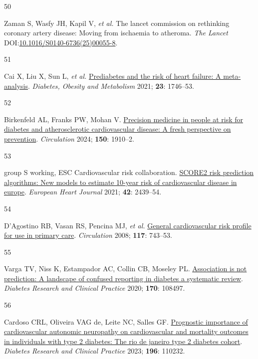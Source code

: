 \documentclass[
  a4paper,
  headsepline=true,
  open=any]{scrbook}
\newlength{\cslhangindent}
\newlength{\csllabelwidth}
\newlength{\cslentryspacingunit} %
\newenvironment{CSLReferences}[2] %
 {%
  \setlength{\parindent}{0pt}
  \ifodd #1
  \let\oldpar\par
  \def\par{\hangindent=\cslhangindent\oldpar}
  \fi
  \setlength{\parskip}{#2\cslentryspacingunit}
 }%
 {}
\newcommand{\CSLLeftMargin}[1]{\parbox[t]{\csllabelwidth}{#1}}
\newcommand{\CSLRightInline}[1]{\parbox[t]{\linewidth - \csllabelwidth}{#1}\break}
\begin{document}
\begin{CSLReferences}{0}{0}
\leavevmode{}%
\CSLLeftMargin{50 }%
\CSLRightInline{Zaman S, Wasfy JH, Kapil V, \emph{et al.} The lancet
commission on rethinking coronary artery disease: Moving from ischaemia
to atheroma. \emph{The Lancet}
DOI:\href{https://doi.org/10.1016/S0140-6736(25)00055-8}{10.1016/S0140-6736(25)00055-8}.}

\leavevmode{}%
\CSLLeftMargin{51 }%
\CSLRightInline{Cai X, Liu X, Sun L, \emph{et al.}
\href{https://doi.org/10.1111/dom.14388}{Prediabetes and the risk of
heart failure: A meta-analysis}. \emph{Diabetes, Obesity and Metabolism}
2021; \textbf{23}: 1746--53.}

\leavevmode{}%
\CSLLeftMargin{52 }%
\CSLRightInline{Birkenfeld AL, Franks PW, Mohan V.
\href{https://doi.org/10.1161/CIRCULATIONAHA.124.070463}{Precision
medicine in people at risk for diabetes and atherosclerotic
cardiovascular disease: A fresh perspective on prevention}.
\emph{Circulation} 2024; \textbf{150}: 1910--2.}

\leavevmode{}%
\CSLLeftMargin{53 }%
\CSLRightInline{group S working, ESC Cardiovascular risk collaboration.
\href{https://doi.org/10.1093/eurheartj/ehab309}{SCORE2 risk prediction
algorithms: New models to estimate 10-year risk of cardiovascular
disease in europe}. \emph{European Heart Journal} 2021; \textbf{42}:
2439--54.}

\leavevmode{}%
\CSLLeftMargin{54 }%
\CSLRightInline{D'Agostino RB, Vasan RS, Pencina MJ, \emph{et al.}
\href{https://doi.org/10.1161/CIRCULATIONAHA.107.699579}{General
cardiovascular risk profile for use in primary care}. \emph{Circulation}
2008; \textbf{117}: 743--53.}

\leavevmode{}%
\CSLLeftMargin{55 }%
\CSLRightInline{Varga TV, Niss K, Estampador AC, Collin CB, Moseley PL.
\href{https://doi.org/10.1016/j.diabres.2020.108497}{Association is not
prediction: A landscape of confused reporting in diabetes {\textendash}
a systematic review}. \emph{Diabetes Research and Clinical Practice}
2020; \textbf{170}: 108497.}

\leavevmode{}%
\CSLLeftMargin{56 }%
\CSLRightInline{Cardoso CRL, Oliveira VAG de, Leite NC, Salles GF.
\href{https://doi.org/10.1016/j.diabres.2022.110232}{Prognostic
importance of cardiovascular autonomic neuropathy on cardiovascular and
mortality outcomes in individuals with type 2 diabetes: The rio de
janeiro type 2 diabetes cohort}. \emph{Diabetes Research and Clinical
Practice} 2023; \textbf{196}: 110232.}


\end{CSLReferences}
\end{document}
